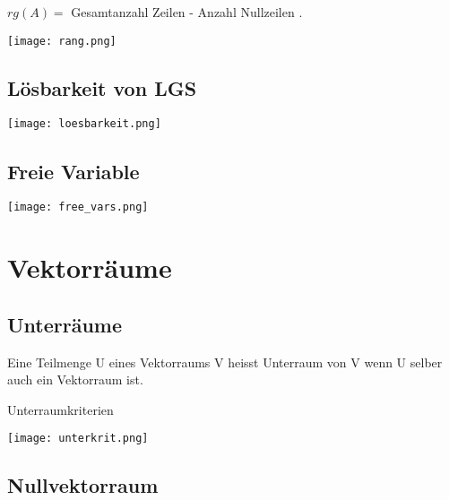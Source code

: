 \begin{multicols*}{3}
    {$rg(A) = $ Gesamtanzahl Zeilen - Anzahl Nullzeilen .}

    \texttt{[image: rang.png]}

    \subsection{Lösbarkeit von LGS}

    \texttt{[image: loesbarkeit.png]}

    \subsection{Freie Variable}

    \texttt{[image: free\_vars.png]}


    \section{Vektorräume}

    \subsection{Unterräume}
    {Eine Teilmenge U eines Vektorraums V heisst Unterraum von V wenn U selber auch ein Vektorraum ist.}

    {Unterraumkriterien}

    \texttt{[image: unterkrit.png]}

    \subsection{Nullvektorraum}


\end{multicols*}


